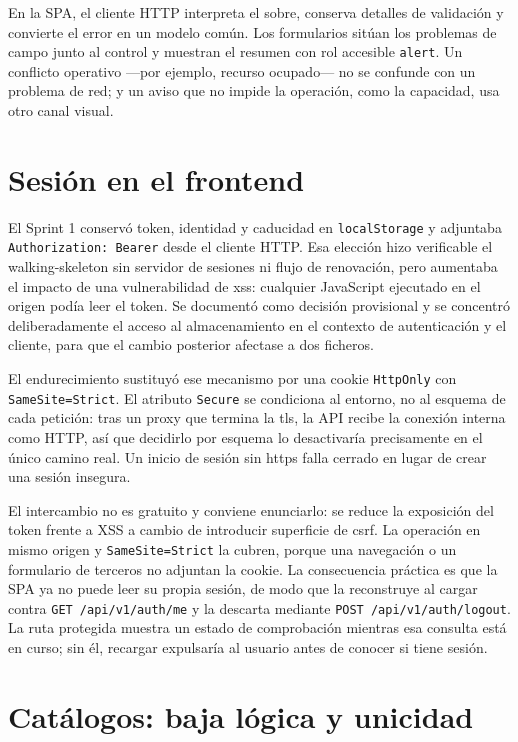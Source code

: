 En la SPA, el cliente HTTP interpreta el sobre, conserva detalles de validación y convierte el error en un modelo común. Los formularios sitúan los problemas de campo junto al control y muestran el resumen con rol accesible \texttt{alert}. Un conflicto operativo ---por ejemplo, recurso ocupado--- no se confunde con un problema de red; y un aviso que no impide la operación, como la capacidad, usa otro canal visual.

\section{Sesión en el frontend}

El Sprint 1 conservó token, identidad y caducidad en \texttt{localStorage} y adjuntaba \texttt{Authorization: Bearer} desde el cliente HTTP. Esa elección hizo verificable el \gls{walking-skeleton} sin servidor de sesiones ni flujo de renovación, pero aumentaba el impacto de una vulnerabilidad de \gls{xss}: cualquier JavaScript ejecutado en el origen podía leer el token. Se documentó como decisión provisional y se concentró deliberadamente el acceso al almacenamiento en el contexto de autenticación y el cliente, para que el cambio posterior afectase a dos ficheros.

El endurecimiento sustituyó ese mecanismo por una cookie \texttt{HttpOnly} con \texttt{SameSite=Strict}. El atributo \texttt{Secure} se condiciona al entorno, no al esquema de cada petición: tras un proxy que termina la \gls{tls}, la API recibe la conexión interna como HTTP, así que decidirlo por esquema lo desactivaría precisamente en el único camino real. Un inicio de sesión sin \gls{https} falla cerrado en lugar de crear una sesión insegura.

El intercambio no es gratuito y conviene enunciarlo: se reduce la exposición del token frente a XSS a cambio de introducir superficie de \gls{csrf}. La operación en mismo origen y \texttt{SameSite=Strict} la cubren, porque una navegación o un formulario de terceros no adjuntan la cookie. La consecuencia práctica es que la SPA ya no puede leer su propia sesión, de modo que la reconstruye al cargar contra \texttt{GET /api/v1/auth/me} y la descarta mediante \texttt{POST /api/v1/auth/logout}. La ruta protegida muestra un estado de comprobación mientras esa consulta está en curso; sin él, recargar expulsaría al usuario antes de conocer si tiene sesión.

\section{Catálogos: baja lógica y unicidad}

